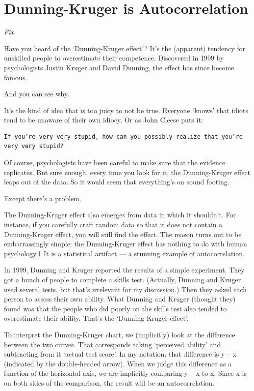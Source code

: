 \documentclass[
]{book}
\begin{document}
\hypertarget{dunning-kruger-is-autocorrelation}{%
\section{Dunning-Kruger is Autocorrelation}\label{dunning-kruger-is-autocorrelation}}

\emph{Fix}

Have you heard of the `Dunning-Kruger effect'? It's the (apparent) tendency for unskilled people to overestimate their competence. Discovered in 1999 by psychologists Justin Kruger and David Dunning, the effect has since become famous.

And you can see why.

It's the kind of idea that is too juicy to not be true. Everyone `knows' that idiots tend to be unaware of their own idiocy. Or as John Cleese puts it:

\begin{verbatim}
If you’re very very stupid, how can you possibly realize that you’re very very stupid? 
\end{verbatim}

Of course, psychologists have been careful to make sure that the evidence replicates. But sure enough, every time you look for it, the Dunning-Kruger effect leaps out of the data. So it would seem that everything's on sound footing.

Except there's a problem.

The Dunning-Kruger effect also emerges from data in which it shouldn't. For instance, if you carefully craft random data so that it does not contain a Dunning-Kruger effect, you will still find the effect. The reason turns out to be embarrassingly simple: the Dunning-Kruger effect has nothing to do with human psychology.1 It is a statistical artifact --- a stunning example of autocorrelation.

In 1999, Dunning and Kruger reported the results of a simple experiment. They got a bunch of people to complete a skills test. (Actually, Dunning and Kruger used several tests, but that's irrelevant for my discussion.) Then they asked each person to assess their own ability. What Dunning and Kruger (thought they) found was that the people who did poorly on the skills test also tended to overestimate their ability. That's the `Dunning-Kruger effect'.

To interpret the Dunning-Kruger chart, we (implicitly) look at the difference between the two curves. That corresponds taking `perceived ability' and subtracting from it `actual test score'. In my notation, that difference is y -- x (indicated by the double-headed arrow). When we judge this difference as a function of the horizontal axis, we are implicitly comparing y -- x to x. Since x is on both sides of the comparison, the result will be an autocorrelation.
\end{document}

